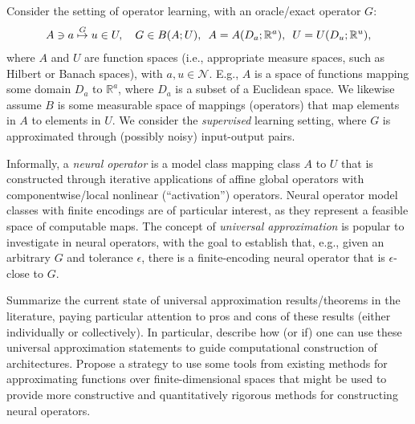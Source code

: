 \documentclass[12pt]{exam}
\def\R{\mathbb{R}}
\def\N{\mathcal{N}}
\begin{document}
\begin{questions}
\question Consider the setting of operator learning, with an oracle/exact operator $G$:
\begin{align*}
  A \ni a \stackrel{G}{\mapsto} u \in U, \hskip 10pt
  G \in B(A; U), \hskip 5pt A = A(D_a; \R^a), \hskip 5pt U = U(D_u; \R^u),
\end{align*}
where $A$ and $U$ are function spaces (i.e., appropriate measure spaces, such as Hilbert or Banach spaces), with $a, u \in \N$. E.g., $A$ is a space of functions mapping some domain $D_a$ to $\R^a$, where $D_a$ is a subset of a Euclidean space. We likewise assume $B$ is some measurable space of mappings (operators) that map elements in $A$ to elements in $U$. We consider the \textit{supervised} learning setting, where $G$ is approximated through (possibly noisy) input-output pairs.

Informally, a \textit{neural operator} is a model class mapping class $A$ to $U$ that is constructed through iterative applications of affine global operators with componentwise/local nonlinear (``activation'') operators. Neural operator model classes with finite encodings are of particular interest, as they represent a feasible space of computable maps. The concept of \textit{universal approximation} is popular to investigate in neural operators, with the goal to establish that, e.g., given an arbitrary $G$ and tolerance $\epsilon$, there is a finite-encoding neural operator that is $\epsilon$-close to $G$.

Summarize the current state of universal approximation results/theorems in the literature, paying particular attention to pros and cons of these results (either individually or collectively). In particular, describe how (or if) one can use these universal approximation statements to guide computational construction of architectures. Propose a strategy to use some tools from existing methods for approximating functions over finite-dimensional spaces that might be used to provide more constructive and quantitatively rigorous methods for constructing neural operators.


\end{questions}
\end{document}
